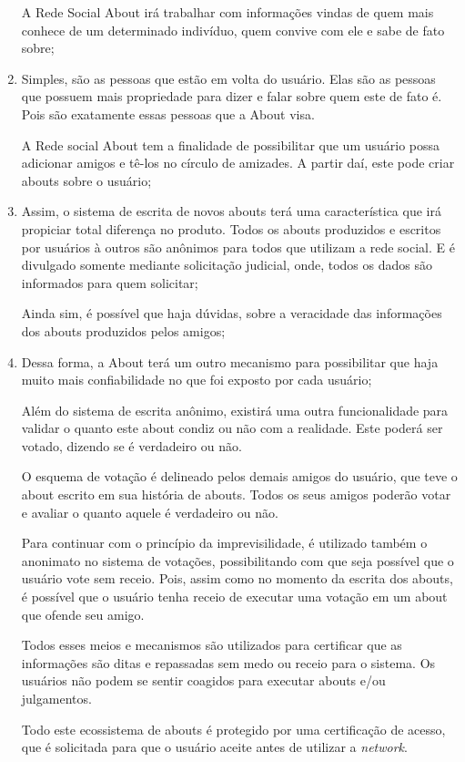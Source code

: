 \begin{enumerate}
        A Rede Social About irá trabalhar com informações vindas de quem mais conhece de um determinado
        indivíduo, quem convive com ele e sabe de fato sobre; 
    \item Simples, são as pessoas que estão em volta do usuário. Elas são as pessoas que possuem mais propriedade para dizer
        e falar sobre quem este de fato é. Pois são exatamente essas pessoas que a About visa.

        A Rede social About tem a finalidade de possibilitar que um usuário possa adicionar amigos  e tê-los no círculo de amizades.
        A partir daí, este pode criar abouts sobre o usuário;

    \item Assim, o sistema de escrita de novos abouts terá uma característica que irá propiciar total diferença
        no produto. Todos os abouts produzidos e escritos por usuários à outros são anônimos para todos
        que utilizam a rede social. E é divulgado somente mediante solicitação judicial, onde, todos
        os dados são informados para quem solicitar;


        Ainda sim, é possível que haja dúvidas, sobre a veracidade das informações dos abouts produzidos pelos amigos;

    \item Dessa forma, a About terá um outro mecanismo para possibilitar que haja muito mais confiabilidade no que foi exposto
        por cada usuário;

        Além do sistema de escrita anônimo, existirá uma outra funcionalidade para validar o quanto este about condiz ou não
        com a realidade. Este poderá ser votado, dizendo se é verdadeiro ou não. 

O esquema de votação é delineado pelos demais amigos do usuário, que teve o about escrito em sua história de abouts.
Todos os seus amigos poderão votar e avaliar o quanto aquele é verdadeiro ou não.

Para continuar com o princípio da imprevisilidade, é utilizado também o anonimato no sistema de votações, possibilitando
com que seja possível que o usuário vote sem receio. Pois, assim como no momento da escrita dos abouts, é possível que o 
usuário tenha receio de executar uma votação em um about que ofende seu amigo.

Todos esses meios e mecanismos são utilizados para certificar que as informações são ditas e repassadas sem medo
ou receio para o sistema. Os usuários não podem se sentir coagidos para executar abouts e/ou julgamentos. 

Todo este ecossistema de abouts é protegido por uma certificação de acesso, que é solicitada para que o usuário
aceite antes de utilizar a \textit{network}.
\end{enumerate}

